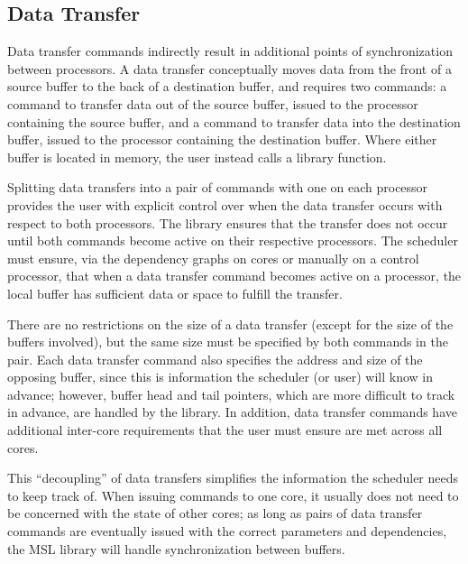 \subsection{Data Transfer}

Data transfer commands indirectly result in additional points of
synchronization between processors. A data transfer conceptually moves
data from the front of a source buffer to the back of a destination
buffer, and requires two commands: a command to transfer data out of
the source buffer, issued to the processor containing the source
buffer, and a command to transfer data into the destination buffer,
issued to the processor containing the destination buffer. Where
either buffer is located in memory, the user instead calls a library
function.

Splitting data transfers into a pair of commands with one on each
processor provides the user with explicit control over when the data
transfer occurs with respect to both processors. The library ensures
that the transfer does not occur until both commands become active on
their respective processors. The scheduler must ensure, via the
dependency graphs on cores or manually on a control processor, that
when a data transfer command becomes active on a processor, the local
buffer has sufficient data or space to fulfill the transfer.


There are no restrictions on the size of a data transfer (except for
the size of the buffers involved), but the same size must be specified
by both commands in the pair. Each data transfer command also
specifies the address and size of the opposing buffer, since this is
information the scheduler (or user) will know in advance; however,
buffer head and tail pointers, which are more difficult to track in
advance, are handled by the library. In addition, data transfer
commands have additional inter-core requirements that the user must
ensure are met across all cores.

This ``decoupling'' of data transfers simplifies the information the
scheduler needs to keep track of. When issuing commands to one core,
it usually does not need to be concerned with the state of other
cores; as long as pairs of data transfer commands are eventually
issued with the correct parameters and dependencies, the MSL library
will handle synchronization between buffers.

